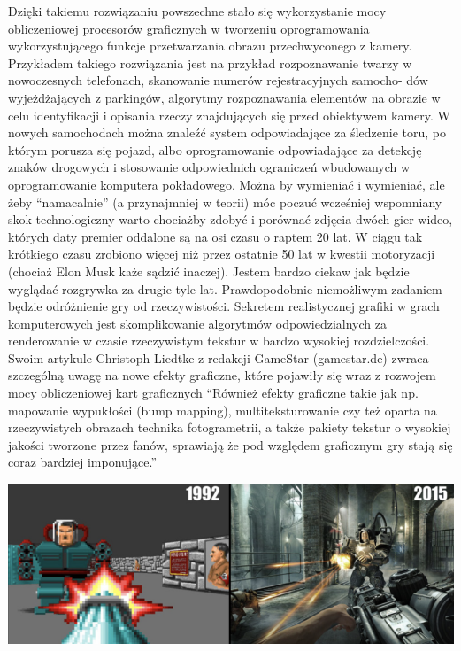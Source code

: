 \documentclass{article}
\begin{document}
\par
Dzięki takiemu rozwiązaniu powszechne stało się wykorzystanie mocy obliczeniowej procesorów graficznych w tworzeniu oprogramowania wykorzystującego funkcje przetwarzania obrazu przechwyconego z kamery. Przykładem takiego rozwiązania jest na przykład rozpoznawanie twarzy w nowoczesnych telefonach, skanowanie numerów rejestracyjnych samocho- dów wyjeżdżających z parkingów, algorytmy rozpoznawania elementów na obrazie w celu identyfikacji i opisania rzeczy znajdujących się przed obiektywem kamery. W nowych samochodach można znaleźć system odpowiadające za śledzenie toru, po którym porusza się pojazd, albo oprogramowanie odpowiadające za detekcję znaków drogowych i stosowanie odpowiednich ograniczeń wbudowanych w oprogramowanie komputera pokładowego. Można by wymieniać i wymieniać, ale żeby “namacalnie” (a przynajmniej w teorii) móc poczuć wcześniej wspomniany skok technologiczny warto chociażby zdobyć i porównać zdjęcia dwóch gier wideo, których daty premier oddalone są na osi czasu o raptem 20 lat. W ciągu tak krótkiego czasu zrobiono więcej niż przez ostatnie 50 lat w kwestii motoryzacji (chociaż Elon Musk każe sądzić inaczej). Jestem bardzo ciekaw jak będzie wyglądać rozgrywka za drugie tyle lat. Prawdopodobnie niemożliwym zadaniem będzie odróżnienie gry od rzeczywistości.
Sekretem realistycznej grafiki w grach komputerowych jest skomplikowanie algorytmów odpowiedzialnych za renderowanie w czasie rzeczywistym tekstur w bardzo wysokiej rozdzielczości. Swoim artykule Christoph Liedtke z redakcji GameStar (gamestar.de) \cite{ref12} zwraca szczególną uwagę na nowe efekty graficzne, które pojawiły się wraz z rozwojem mocy obliczeniowej kart graficznych “Również efekty graficzne takie jak np. mapowanie wypukłości (bump mapping), multiteksturowanie czy też oparta na rzeczywistych obrazach technika fotogrametrii, a także pakiety tekstur o wysokiej jakości tworzone przez fanów, sprawiają że pod względem graficznym gry stają się coraz bardziej imponujące.”\\
\begin{center}
\includegraphics{grafika}
\end{center}
\end{document}
